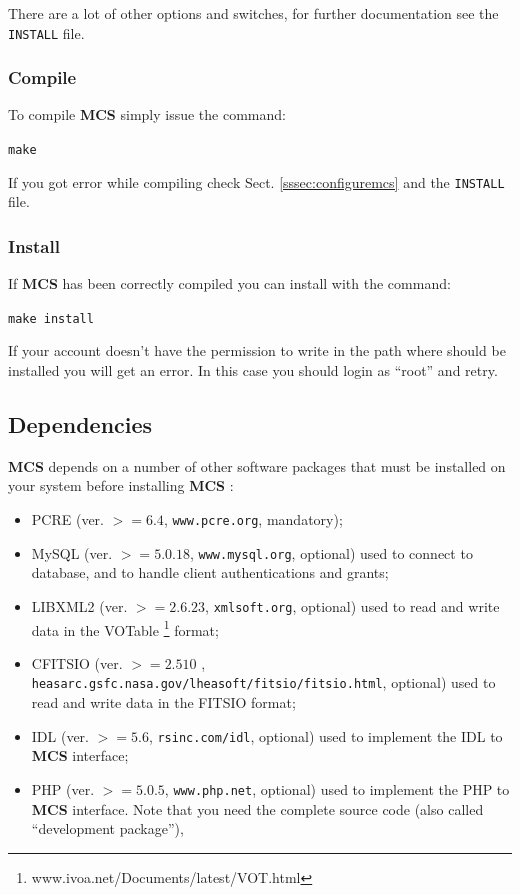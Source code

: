 \documentclass[12pt,titlepage]{book}
\newcommand{\mcs}{\textbf{MCS} }
\begin{document}
\noindent There are a lot of other options and switches, for further
documentation see the \verb|INSTALL| file.



\subsubsection{Compile}
\label{sssec:compilemcs}
To compile \mcs simply issue the command:

\bigskip

\verb|make|

\bigskip

\noindent If you got error while compiling check
Sect. \ref{sssec:configuremcs} and the \verb|INSTALL| file.


\subsubsection{Install}
\label{sssec:installmcs}
If \mcs has been correctly compiled you can install with the command:

\bigskip

\verb|make install|

\bigskip

\noindent If your account doesn't have the permission to write in the
path where should be installed you will get an error. In this case you
should login as ``root'' and retry.



\subsection{Dependencies}
\label{ssec:dependencies}

\noindent \mcs depends on a number of other software packages that
must be installed on your system before installing \mcs:
\begin{itemize}
\item PCRE (ver. $>= 6.4$, \verb|www.pcre.org|, mandatory);
\item MySQL (ver. $>= 5.0.18$, \verb|www.mysql.org|, optional) used to
  connect to database, and to handle client authentications and
  grants;
\item LIBXML2 (ver. $>= 2.6.23$, \verb|xmlsoft.org|, optional) used to
  read and write data in the VOTable
  \footnote{www.ivoa.net/Documents/latest/VOT.html} format;
\item CFITSIO (ver. $>= 2.510$ ,
  \verb|heasarc.gsfc.nasa.gov/lheasoft/fitsio/fitsio.html|, optional)
  used to read and write data in the FITSIO format;
\item IDL (ver. $>= 5.6$, \verb|rsinc.com/idl|, optional) used to
  implement the IDL to \mcs interface;
\item PHP (ver. $>= 5.0.5$, \verb|www.php.net|, optional) used to
  implement the PHP to \mcs interface. Note that you need the complete
  source code (also called ``development package''),
\end{itemize}
\end{document}
